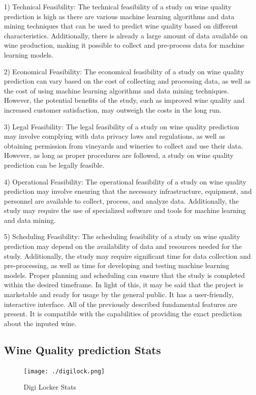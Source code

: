 \documentclass[a4paper, 12pt]{report}
\begin{document}
1) Technical Feasibility: The technical feasibility of a study on wine quality prediction is high as there are various machine learning algorithms and data mining techniques that can be used to predict wine quality based on different characteristics. Additionally, there is already a large amount of data available on wine production, making it possible to collect and pre-process data for machine learning models.

2) Economical Feasibility: The economical feasibility of a study on wine quality prediction can vary based on the cost of collecting and processing data, as well as the cost of using machine learning algorithms and data mining techniques. However, the potential benefits of the study, such as improved wine quality and increased customer satisfaction, may outweigh the costs in the long run.

3) Legal Feasibility: The legal feasibility of a study on wine quality prediction may involve complying with data privacy laws and regulations, as well as obtaining permission from vineyards and wineries to collect and use their data. However, as long as proper procedures are followed, a study on wine quality prediction can be legally feasible.

4) Operational Feasibility: The operational feasibility of a study on wine quality prediction may involve ensuring that the necessary infrastructure, equipment, and personnel are available to collect, process, and analyze data. Additionally, the study may require the use of specialized software and tools for machine learning and data mining.

5) Scheduling Feasibility: The scheduling feasibility of a study on wine quality prediction may depend on the availability of data and resources needed for the study. Additionally, the study may require significant time for data collection and pre-processing, as well as time for developing and testing machine learning models. Proper planning and scheduling can ensure that the study is completed within the desired timeframe.
\newline
\newline
In light of this, it may be said that the project is marketable and ready for usage by the general public. It has a user-friendly, interactive interface. All of the previously described fundamental features are present. It is compatible with the capabilities of providing the exact prediction about the inputed wine.
\pagebreak
\subsection{Wine Quality prediction Stats}
\begin{figure}[h]
\centering
\texttt{[image: ./digilock.png]}
\caption{Digi Locker Stats}
\end{figure}
\end{document}
